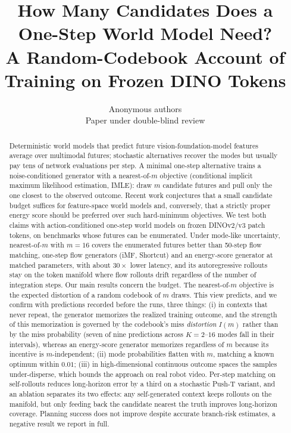 \documentclass[10pt]{article} %
\title{How Many Candidates Does a One-Step World Model Need?\\A Random-Codebook Account of \Nom{} Training on Frozen DINO Tokens}
\author{\name Anonymous authors \email \\
      \addr Paper under double-blind review}
\newcommand{\nom}{nearest-of-$m$}
\begin{document}
\maketitle

\begin{abstract}
Deterministic world models that predict future vision-foundation-model features average over multimodal futures; stochastic alternatives recover the modes but usually pay tens of network evaluations per step. A minimal one-step alternative trains a noise-conditioned generator with a \nom{} objective (conditional implicit maximum likelihood estimation, IMLE): draw $m$ candidate futures and pull only the one closest to the observed outcome. Recent work conjectures that a small candidate budget suffices for feature-space world models and, conversely, that a strictly proper energy score should be preferred over such hard-minimum objectives. We test both claims with action-conditioned one-step world models on frozen DINOv2/v3 patch tokens, on benchmarks whose futures can be enumerated. Under mode-like uncertainty, \nom{} with $m{=}16$ covers the enumerated futures better than 50-step flow matching, one-step flow generators (iMF, Shortcut) and an energy-score generator at matched parameters, with about $30\times$ lower latency, and its autoregressive rollouts stay on the token manifold where flow rollouts drift regardless of the number of integration steps. Our main results concern the budget. The \nom{} objective is the expected distortion of a random codebook of $m$ draws. This view predicts, and we confirm with predictions recorded before the runs, three things: (i) in contexts that never repeat, the generator memorizes the realized training outcome, and the strength of this memorization is governed by the codebook's miss \emph{distortion} $I(m)$ rather than by the miss probability (seven of nine predictions across $K{=}2$--$16$ modes fall in their intervals), whereas an energy-score generator memorizes regardless of $m$ because its incentive is $m$-independent; (ii) mode probabilities flatten with $m$, matching a known optimum within $0.01$; (iii) in high-dimensional continuous outcome spaces the samples under-disperse, which bounds the approach on real robot video. Per-step matching on self-rollouts reduces long-horizon error by a third on a stochastic Push-T variant, and an ablation separates its two effects: any self-generated context keeps rollouts on the manifold, but only feeding back the candidate nearest the truth improves long-horizon coverage. Planning success does not improve despite accurate branch-risk estimates, a negative result we report in full.
\end{abstract}
\end{document}
